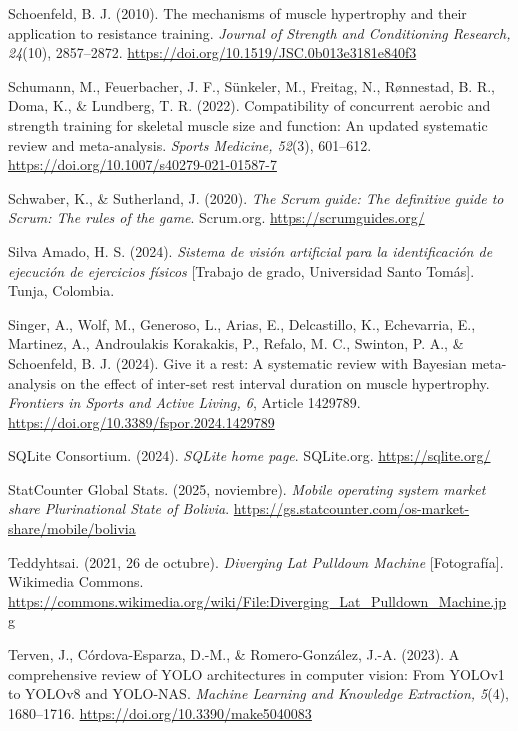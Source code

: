 \begin{referenciasapa}
\item Schoenfeld, B. J. (2010). The mechanisms of muscle hypertrophy and their application to resistance training. \textit{Journal of Strength and Conditioning Research, 24}(10), 2857--2872. \url{https://doi.org/10.1519/JSC.0b013e3181e840f3}

\item Schumann, M., Feuerbacher, J. F., Sünkeler, M., Freitag, N., Rønnestad, B. R., Doma, K., \& Lundberg, T. R. (2022).
    Compatibility of concurrent aerobic and strength training for skeletal muscle size and function: An updated systematic review and meta-analysis.
    \textit{Sports Medicine, 52}(3), 601--612.
    \url{https://doi.org/10.1007/s40279-021-01587-7}

\item Schwaber, K., \& Sutherland, J. (2020). \textit{The Scrum guide: The definitive guide to Scrum: The rules of the game}. Scrum.org. \url{https://scrumguides.org/}

\item Silva Amado, H. S. (2024). \textit{Sistema de visión artificial para la identificación de ejecución de ejercicios físicos} [Trabajo de grado, Universidad Santo Tomás]. Tunja, Colombia.

\item Singer, A., Wolf, M., Generoso, L., Arias, E., Delcastillo, K., Echevarria, E., Martinez, A., Androulakis Korakakis, P., Refalo, M. C., Swinton, P. A., \& Schoenfeld, B. J. (2024). Give it a rest: A systematic review with Bayesian meta-analysis on the effect of inter-set rest interval duration on muscle hypertrophy. \textit{Frontiers in Sports and Active Living, 6}, Article 1429789. \url{https://doi.org/10.3389/fspor.2024.1429789}

\item SQLite Consortium. (2024). \textit{SQLite home page}. SQLite.org. \url{https://sqlite.org/}

\item StatCounter Global Stats. (2025, noviembre). \textit{Mobile operating system market share Plurinational State of Bolivia}. \url{https://gs.statcounter.com/os-market-share/mobile/bolivia}

\item Teddyhtsai. (2021, 26 de octubre). \textit{Diverging Lat Pulldown Machine} [Fotografía]. Wikimedia Commons. \url{https://commons.wikimedia.org/wiki/File:Diverging_Lat_Pulldown_Machine.jpg}

\item Terven, J., Córdova-Esparza, D.-M., \& Romero-González, J.-A. (2023). A comprehensive review of YOLO architectures in computer vision: From YOLOv1 to YOLOv8 and YOLO-NAS. \textit{Machine Learning and Knowledge Extraction, 5}(4), 1680--1716. \url{https://doi.org/10.3390/make5040083}


\end{referenciasapa}
